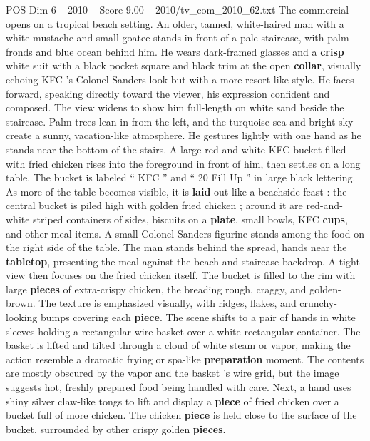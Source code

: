 \begin{textsample}{POS Dim 6 – 2010 – Score 9.00 – 2010/tv\_com\_2010\_62.txt}  \label{ex:f6_pos_082}
The commercial opens on a tropical beach setting.
An older, tanned, white-haired man with a white mustache and small goatee stands in front of a pale staircase, with palm fronds and blue ocean behind him.
He wears dark-framed glasses and a \textbf{crisp} white suit with a black pocket square and black trim at the open \textbf{collar}, visually echoing KFC ’s Colonel Sanders look but with a more resort-like style.
He faces forward, speaking directly toward the viewer, his expression confident and composed.
The view widens to show him full-length on white sand beside the staircase.
Palm trees lean in from the left, and the turquoise sea and bright sky create a sunny, vacation-like atmosphere.
He gestures lightly with one hand as he stands near the bottom of the stairs.
A large red-and-white KFC bucket filled with fried chicken rises into the foreground in front of him, then settles on a long table.
The bucket is labeled “ KFC ” and “ 20 Fill Up ” in large black lettering.
As more of the table becomes visible, it is \textbf{laid} out like a beachside feast : the central bucket is piled high with golden fried chicken ; around it are red-and-white striped containers of sides, biscuits on a \textbf{plate}, small bowls, KFC \textbf{cups}, and other meal items.
A small Colonel Sanders figurine stands among the food on the right side of the table.
The man stands behind the spread, hands near the \textbf{tabletop}, presenting the meal against the beach and staircase backdrop.
A tight view then focuses on the fried chicken itself.
The bucket is filled to the rim with large \textbf{pieces} of extra-crispy chicken, the breading rough, craggy, and golden-brown.
The texture is emphasized visually, with ridges, flakes, and crunchy-looking bumps covering each \textbf{piece}.
The scene shifts to a pair of hands in white sleeves holding a rectangular wire basket over a white rectangular container.
The basket is lifted and tilted through a cloud of white steam or vapor, making the action resemble a dramatic frying or spa-like \textbf{preparation} moment.
The contents are mostly obscured by the vapor and the basket ’s wire grid, but the image suggests hot, freshly prepared food being handled with care.
Next, a hand uses shiny silver claw-like tongs to lift and display a \textbf{piece} of fried chicken over a bucket full of more chicken.
The chicken \textbf{piece} is held close to the surface of the bucket, surrounded by other crispy golden \textbf{pieces}.

\end{textsample}
